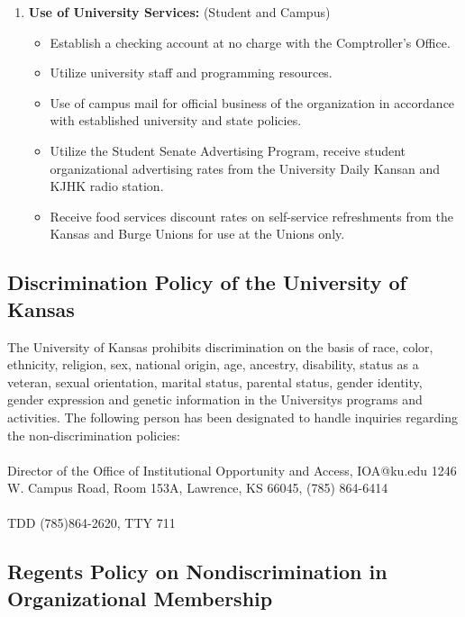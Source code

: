 \begin{enumerate}
	\item \textbf{Use of University Services:} (Student and Campus)
	\begin{itemize}
		\item Establish a checking account at no charge with the Comptroller's Office.
		\item Utilize university staff and programming resources.
		\item Use of campus mail for official business of the organization in accordance with established university and state policies.
		\item Utilize the Student Senate Advertising Program, receive student organizational advertising rates from the University Daily Kansan and KJHK radio station.
		\item Receive food services discount rates on self-service refreshments from the Kansas and Burge Unions for use at the Unions only.
	\end{itemize}
\end{enumerate}


\subsection{Discrimination Policy of the University of Kansas}

The University of Kansas prohibits discrimination on the basis of race, color, ethnicity, religion, sex, national origin, age, ancestry, disability, status as a veteran, sexual orientation, marital status, parental status, gender identity, gender expression and genetic information in the University\’s programs and activities. The following person has been designated to handle inquiries regarding the non-discrimination policies:
\\
\\
Director of the Office of Institutional Opportunity and Access, IOA@ku.edu
1246 W. Campus Road, Room 153A, Lawrence, KS 66045, (785) 864-6414
\\
\\
TDD (785)864-2620, TTY 711

\subsection{Regents Policy on Nondiscrimination in Organizational Membership}

